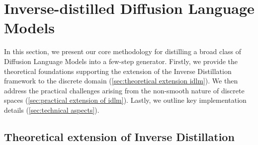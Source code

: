 \vspace{-2mm}
\section{Inverse-distilled Diffusion Language Models}
\vspace{-2mm}
\label{sec:idlm}
  In this section, we present our core methodology for distilling a broad class of Diffusion Language Models into a few-step generator. Firstly, we provide the theoretical foundations supporting the extension of the Inverse Distillation framework to the discrete domain (\wasyparagraph\ref{sec:theoretical extension idlm}). We then address the practical challenges arising from the non-smooth nature of discrete spaces (\wasyparagraph\ref{sec:practical extension of idlm}). Lastly, we outline key implementation details (\wasyparagraph\ref{sec:technical aspects}).

\vspace{-1mm}
\subsection{Theoretical extension of Inverse Distillation}
\vspace{-1mm}
\label{sec:theoretical extension idlm}

